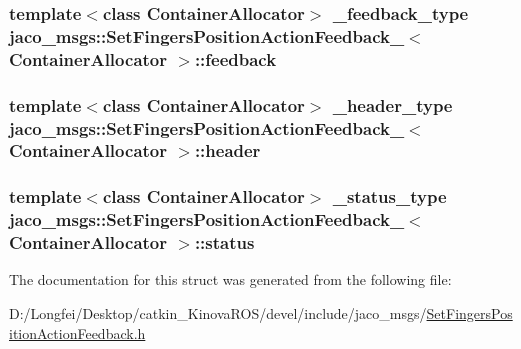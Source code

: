 \subsubsection[{\texorpdfstring{feedback}{feedback}}]{\setlength{\rightskip}{0pt plus 5cm}template$<$class Container\+Allocator$>$ {\bf \+\_\+feedback\+\_\+type} {\bf jaco\+\_\+msgs\+::\+Set\+Fingers\+Position\+Action\+Feedback\+\_\+}$<$ Container\+Allocator $>$\+::feedback}\hypertarget{structjaco__msgs_1_1SetFingersPositionActionFeedback___a4c94007aeb334a1eaa98104b7a8cb86c}{}\label{structjaco__msgs_1_1SetFingersPositionActionFeedback___a4c94007aeb334a1eaa98104b7a8cb86c}
\subsubsection[{\texorpdfstring{header}{header}}]{\setlength{\rightskip}{0pt plus 5cm}template$<$class Container\+Allocator$>$ {\bf \+\_\+header\+\_\+type} {\bf jaco\+\_\+msgs\+::\+Set\+Fingers\+Position\+Action\+Feedback\+\_\+}$<$ Container\+Allocator $>$\+::header}\hypertarget{structjaco__msgs_1_1SetFingersPositionActionFeedback___a19ad5326591e67e1b587b9dd4feaf43a}{}\label{structjaco__msgs_1_1SetFingersPositionActionFeedback___a19ad5326591e67e1b587b9dd4feaf43a}
\subsubsection[{\texorpdfstring{status}{status}}]{\setlength{\rightskip}{0pt plus 5cm}template$<$class Container\+Allocator$>$ {\bf \+\_\+status\+\_\+type} {\bf jaco\+\_\+msgs\+::\+Set\+Fingers\+Position\+Action\+Feedback\+\_\+}$<$ Container\+Allocator $>$\+::status}\hypertarget{structjaco__msgs_1_1SetFingersPositionActionFeedback___a71d3e9d0ba73d2d1db190090ddbdf943}{}\label{structjaco__msgs_1_1SetFingersPositionActionFeedback___a71d3e9d0ba73d2d1db190090ddbdf943}


The documentation for this struct was generated from the following file\+:\begin{DoxyCompactItemize}
\item 
D\+:/\+Longfei/\+Desktop/catkin\+\_\+\+Kinova\+R\+O\+S/devel/include/jaco\+\_\+msgs/\hyperlink{SetFingersPositionActionFeedback_8h}{Set\+Fingers\+Position\+Action\+Feedback.\+h}\end{DoxyCompactItemize}
